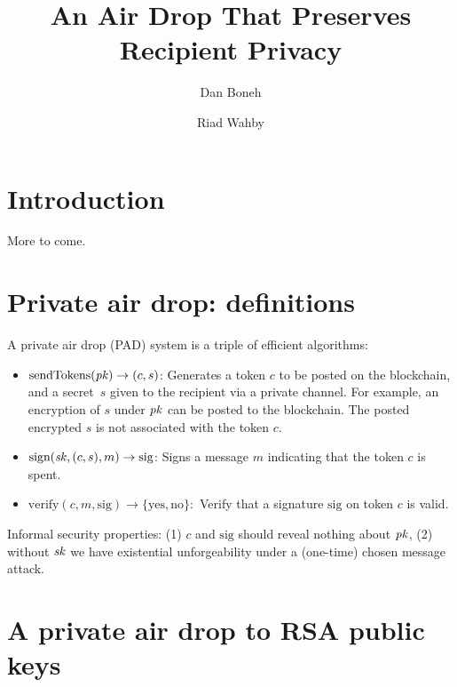 \documentclass[11pt]{article}
\begin{document}
\title{An Air Drop That Preserves Recipient Privacy}
\author{Dan Boneh \and Riad Wahby}

\maketitle

\begin{abstract}
\end{abstract}

\section{Introduction}

More to come.


\section{Private air drop: definitions}


A private air drop (PAD) system is a triple of efficient algorithms:
\begin{itemize}
\item $\text{sendTokens}(\mathit{pk}) \to (c, s)$:
Generates a token $c$ to be posted on the blockchain,
and a secret~$s$ given to the recipient via a private channel.
For example, an encryption of $s$ under $\mathit{pk}$ can be posted
to the blockchain.   The posted encrypted $s$ is not associated with 
the token $c$. 

\item $\text{sign}(\mathit{sk}, (c, s), m) \to \text{sig}$:
Signs a message $m$ indicating that the token $c$ is spent.

\item $\text{verify}(c, m, \text{sig}) \to \{\text{yes},\text{no}\}:$
Verify that a signature $\text{sig}$ on token $c$ is valid.
\end{itemize}

Informal security properties: 
(1) $c$ and $\text{sig}$ should reveal nothing about $\mathit{pk}$,
(2) without $\mathit{sk}$ we have existential unforgeability under a 
(one-time) chosen message attack.



\section{A private air drop to RSA public keys}
\end{document}
